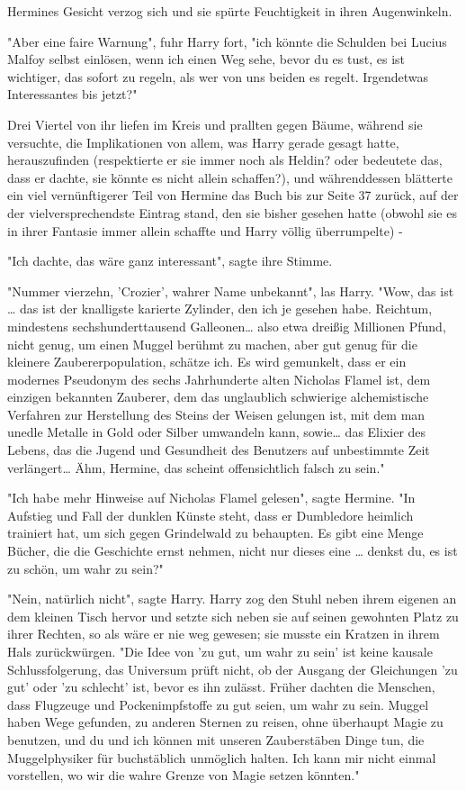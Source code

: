 {Hermines Gesicht verzog sich und sie spürte Feuchtigkeit in ihren Augenwinkeln.

"Aber eine faire Warnung", fuhr Harry fort, "ich könnte die Schulden bei Lucius Malfoy selbst einlösen, wenn ich einen Weg sehe, bevor du es tust, es ist wichtiger, das sofort zu regeln, als wer von uns beiden es regelt. Irgendetwas Interessantes bis jetzt?"

Drei Viertel von ihr liefen im Kreis und prallten gegen Bäume, während sie versuchte, die Implikationen von allem, was Harry gerade gesagt hatte, herauszufinden (respektierte er sie immer noch als Heldin? oder bedeutete das, dass er dachte, sie könnte es nicht allein schaffen?), und währenddessen blätterte ein viel vernünftigerer Teil von Hermine das Buch bis zur Seite 37 zurück, auf der der vielversprechendste Eintrag stand, den sie bisher gesehen hatte (obwohl sie es in ihrer Fantasie immer allein schaffte und Harry völlig überrumpelte) -

"Ich dachte, das wäre ganz interessant", sagte ihre Stimme.

"Nummer vierzehn, 'Crozier', wahrer Name unbekannt", las Harry. "Wow, das ist … das ist der knalligste karierte Zylinder, den ich je gesehen habe. Reichtum, mindestens sechshunderttausend Galleonen… also etwa dreißig Millionen Pfund, nicht genug, um einen Muggel berühmt zu machen, aber gut genug für die kleinere Zaubererpopulation, schätze ich. Es wird gemunkelt, dass er ein modernes Pseudonym des sechs Jahrhunderte alten Nicholas Flamel ist, dem einzigen bekannten Zauberer, dem das unglaublich schwierige alchemistische Verfahren zur Herstellung des Steins der Weisen gelungen ist, mit dem man unedle Metalle in Gold oder Silber umwandeln kann, sowie… das Elixier des Lebens, das die Jugend und Gesundheit des Benutzers auf unbestimmte Zeit verlängert… Ähm, Hermine, das scheint offensichtlich falsch zu sein."

"Ich habe mehr Hinweise auf Nicholas Flamel gelesen", sagte Hermine. "In Aufstieg und Fall der dunklen Künste steht, dass er Dumbledore heimlich trainiert hat, um sich gegen Grindelwald zu behaupten. Es gibt eine Menge Bücher, die die Geschichte ernst nehmen, nicht nur dieses eine … denkst du, es ist zu schön, um wahr zu sein?"

"Nein, natürlich nicht", sagte Harry. Harry zog den Stuhl neben ihrem eigenen an dem kleinen Tisch hervor und setzte sich neben sie auf seinen gewohnten Platz zu ihrer Rechten, so als wäre er nie weg gewesen; sie musste ein Kratzen in ihrem Hals zurückwürgen. "Die Idee von 'zu gut, um wahr zu sein' ist keine kausale Schlussfolgerung, das Universum prüft nicht, ob der Ausgang der Gleichungen 'zu gut' oder 'zu schlecht' ist, bevor es ihn zulässt. Früher dachten die Menschen, dass Flugzeuge und Pockenimpfstoffe zu gut seien, um wahr zu sein. Muggel haben Wege gefunden, zu anderen Sternen zu reisen, ohne überhaupt Magie zu benutzen, und du und ich können mit unseren Zauberstäben Dinge tun, die Muggelphysiker für buchstäblich unmöglich halten. Ich kann mir nicht einmal vorstellen, wo wir die wahre Grenze von Magie setzen könnten."

}
